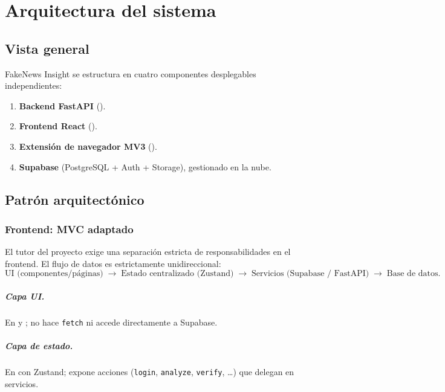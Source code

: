 \chapter{Arquitectura del sistema}\label{cap:arquitectura}

\section{Vista general}

FakeNews Insight se estructura en cuatro componentes desplegables
independientes:

\begin{enumerate}[leftmargin=*,itemsep=0.2em]
  \item \textbf{Backend FastAPI} ().
  \item \textbf{Frontend React} ().
  \item \textbf{Extensión de navegador MV3}
        ().
  \item \textbf{Supabase} (PostgreSQL + Auth + Storage), gestionado en
        la nube.
\end{enumerate}


\section{Patrón arquitectónico}

\subsection{Frontend: MVC adaptado}

El tutor del proyecto exige una separación estricta de
responsabilidades en el frontend. El flujo de datos es estrictamente
unidireccional:
\[
  \text{UI (componentes/páginas)}
  \;\to\;
  \text{Estado centralizado (Zustand)}
  \;\to\;
  \text{Servicios (Supabase / FastAPI)}
  \;\to\;
  \text{Base de datos}.
\]

\paragraph{Capa UI.} En  y ;
no hace \texttt{fetch} ni accede directamente a Supabase.

\paragraph{Capa de estado.} En  con Zustand; expone
acciones (\texttt{login}, \texttt{analyze}, \texttt{verify}, \dots) que
delegan en servicios.

